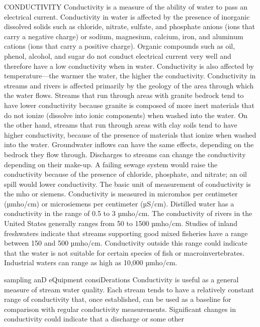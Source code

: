 \documentclass{article}
\begin{document}
CONDUCTIVITY Conductivity is a measure of the ability of water to pass
an electrical current. Conductivity in water is affected by the presence
of inorganic dissolved solids such as chloride, nitrate, sulfate, and
phosphate anions (ions that carry a negative charge) or sodium,
magnesium, calcium, iron, and aluminum cations (ions that carry a
positive charge). Organic compounds such as oil, phenol, alcohol, and
sugar do not conduct electrical current very well and therefore have a
low conductivity when in water. Conductivity is also affected by
temperature---the warmer the water, the higher the conductivity.
Conductivity in streams and rivers is affected primarily by the geology
of the area through which the water flows. Streams that run through
areas with granite bedrock tend to have lower conductivity because
granite is composed of more inert materials that do not ionize (dissolve
into ionic components) when washed into the water. On the other hand,
streams that run through areas with clay soils tend to have higher
conductivity, because of the presence of materials that ionize when
washed into the water. Groundwater inflows can have the same effects,
depending on the bedrock they flow through. Discharges to streams can
change the conductivity depending on their make-up. A failing sewage
system would raise the conductivity because of the presence of chloride,
phosphate, and nitrate; an oil spill would lower conductivity. The basic
unit of measurement of conductivity is the mho or siemens. Conductivity
is measured in micromhos per centimeter (µmho/cm) or microsiemens per
centimeter (µS/cm). Distilled water has a conductivity in the range of
0.5 to 3 µmho/cm. The conductivity of rivers in the United States
generally ranges from 50 to 1500 µmho/cm. Studies of inland freshwaters
indicate that streams supporting good mixed fisheries have a range
between 150 and 500 µmho/cm. Conductivity outside this range could
indicate that the water is not suitable for certain species of fish or
macroinvertebrates. Industrial waters can range as high as 10,000
µmho/cm.

sampling anD eQuipment consiDerations Conductivity is useful as a
general measure of stream water quality. Each stream tends to have a
relatively constant range of conductivity that, once established, can be
used as a baseline for comparison with regular conductivity
measurements. Significant changes in conductivity could indicate that a
discharge or some other
\end{document}
